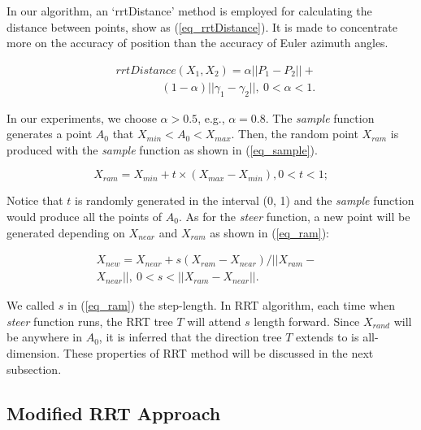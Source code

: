 \documentclass[letterpaper, 10 pt, conference]{ieeeconf}  %
\begin{document}
In our algorithm, an `rrtDistance' method is employed for calculating the distance between points, show as (\ref{eq_rrtDistance}). It is made to concentrate more on the accuracy of position than the accuracy of Euler azimuth angles.

 \begin{equation}
 \begin{array}{ll}
 &rrtDistance(X_{1},X_{2})=\alpha ||P_{1}-P_{2}|| + \\
& \qquad\qquad (1-\alpha) ||\gamma_{1}-\gamma_{2}||, \ 0 < \alpha < 1.
 \end{array}
 \label{eq_rrtDistance}
 \end{equation}

 In our experiments, we choose $\alpha > 0.5$, e.g., $\alpha = 0.8$. The \textit{sample} function generates a point $A_{0}$ that $X_{min} < A_{0} < X_{max}$. Then, the random point $X_{ram}$ is produced with the \textit{sample} function as shown in  (\ref{eq_sample}).

 \begin{equation}
 X_{ram} = X_{min} + t \times (X_{max}-X_{min}), 0<t<1;
  \label{eq_sample}
 \end{equation}

Notice that $t$ is randomly generated in the interval (0, 1) and the \textit{sample} function would produce all the points of $A_{0}$. As for the \textit{steer} function, a new point will be generated depending on $X_{near}$ and $X_{ram}$ as shown in (\ref{eq_ram}):

\begin{equation} \label{eq_ram}
 \begin{array}{rr}
 X_{new} = X_{near} + s(X_{ram}-X_{near})/||X_{ram}-&\\
 X_{near}||,\ 0<s<||X_{ram}-X_{near}||.&
 \end{array}
 \end{equation}

 We called $s$ in (\ref{eq_ram}) the step-length. In RRT algorithm, each time when \textit{steer} function runs, the RRT tree $T$ will attend $s$ length forward. Since $X_{rand}$ will be anywhere in $A_{0}$, it is inferred that the direction tree $T$ extends to is all-dimension. These properties of RRT method will be discussed in the next subsection.

\subsection{Modified RRT Approach}
\end{document}
